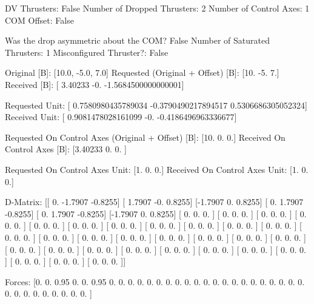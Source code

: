 DV Thrusters:	False
Number of Dropped Thrusters:	2
Number of Control Axes:	1
COM Offset:	False

Was the drop asymmetric about the COM?	False
Number of Saturated Thrusters:	1
Misconfigured Thruster?:	False

Original [B]:	[10.0, -5.0, 7.0]
Requested (Original + Offset) [B]:	[10. -5.  7.]
Received [B]:		[ 3.40233            -0.                 -1.5684500000000001]

Requested Unit:		[ 0.7580980435789034 -0.3790490217894517  0.5306686305052324]
Received Unit:		[ 0.9081478028161099 -0.                 -0.4186496963336677]

Requested On Control Axes (Original + Offset) [B]:	[10.  0.  0.]
Received On Control Axes [B]:		[3.40233 0.      0.     ]

Requested On Control Axes Unit:		[1. 0. 0.]
Received On Control Axes Unit:		[1. 0. 0.]

D-Matrix:
[[ 0.     -1.7907 -0.8255]
 [ 1.7907 -0.      0.8255]
 [-1.7907  0.      0.8255]
 [ 0.      1.7907 -0.8255]
 [ 0.      1.7907 -0.8255]
 [-1.7907  0.      0.8255]
 [ 0.      0.      0.    ]
 [ 0.      0.      0.    ]
 [ 0.      0.      0.    ]
 [ 0.      0.      0.    ]
 [ 0.      0.      0.    ]
 [ 0.      0.      0.    ]
 [ 0.      0.      0.    ]
 [ 0.      0.      0.    ]
 [ 0.      0.      0.    ]
 [ 0.      0.      0.    ]
 [ 0.      0.      0.    ]
 [ 0.      0.      0.    ]
 [ 0.      0.      0.    ]
 [ 0.      0.      0.    ]
 [ 0.      0.      0.    ]
 [ 0.      0.      0.    ]
 [ 0.      0.      0.    ]
 [ 0.      0.      0.    ]
 [ 0.      0.      0.    ]
 [ 0.      0.      0.    ]
 [ 0.      0.      0.    ]
 [ 0.      0.      0.    ]
 [ 0.      0.      0.    ]
 [ 0.      0.      0.    ]
 [ 0.      0.      0.    ]
 [ 0.      0.      0.    ]
 [ 0.      0.      0.    ]
 [ 0.      0.      0.    ]
 [ 0.      0.      0.    ]
 [ 0.      0.      0.    ]]

Forces:
[0.   0.   0.95 0.   0.   0.95 0.   0.   0.   0.   0.   0.   0.   0.
 0.   0.   0.   0.   0.   0.   0.   0.   0.   0.   0.   0.   0.   0.
 0.   0.   0.   0.   0.   0.   0.   0.  ]

